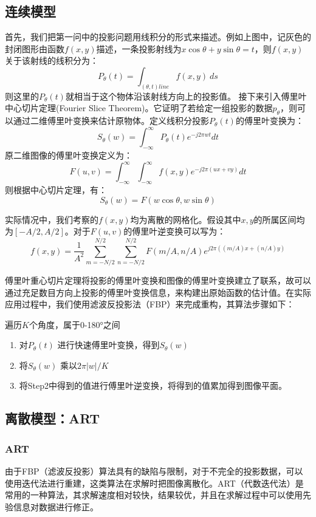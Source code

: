 \documentclass{myart}
\begin{document}
\subsection{连续模型}
首先，我们把第一问中的投影问题用线积分的形式来描述。例如上图中，记灰色的封闭图形由函数\(f(x, y)\)描述，一条投影射线为\(x\cos\theta + y\sin\theta = t\)，则\(f(x, y)\)关于该射线的线积分为：
\[ P_\theta (t) = \int_{(\theta, t) line}f(x, y)\ ds \]
则这里的\(P_\theta(t)\)就相当于这个物体沿该射线方向上的投影值。
接下来引入傅里叶中心切片定理(Fourier Slice Theorem)。\cite{toumo}它证明了若给定一组投影的数据\(p_\theta\)，则可以通过二维傅里叶变换来估计原物体。定义线积分投影\(P_\theta(t)\)的傅里叶变换为：
\[S_\theta (w) = \int_{-\infty}^{\infty}P_\theta (t) e^{-j2\pi wt}dt \]
原二维图像的傅里叶变换定义为：
\[F(u, v) = \int_{-\infty}^{\infty}\int_{-\infty}^{\infty} f(x, y)e^{-j2\pi (ux + vy)}dt\]
则根据中心切片定理，有：
\[S_\theta (w) = F(w\cos\theta, w\sin\theta) \]

实际情况中，我们考察的\( f(x, y)\)均为离散的网格化。假设其中\(x, y\)的所属区间均为\( [-A/2, A/2]\)。对于\(F(u, v)\)的傅里叶逆变换可以写为\cite{radon}：
\[f(x, y) = \frac{1}{A^2} \sum_{m = -N/2}^{N/2}\sum_{n=-N/2}^{N/2}F(m/A, n/A)e^{j2\pi ((m/A)x + (n/A)y)} \]

傅里叶重心切片定理将投影的傅里叶变换和图像的傅里叶变换建立了联系，故可以通过充足数目方向上投影的傅里叶变换信息，来构建出原始函数的估计值。在实际应用过程中，我们使用滤波反投影法（FBP）来完成重构，其算法步骤如下：

遍历\(K\)个角度，属于0-180°之间
\begin{enumerate}
  \item 对\(P_\theta (t) \) 进行快速傅里叶变换，得到\(S_\theta(w) \)
  \item 将\(S_\theta(w) \) 乘以\(2\pi|w|/K\)
  \item 将Step2中得到的值进行傅里叶逆变换，将得到的值累加得到图像平面。
\end{enumerate}


\subsection{离散模型：ART}
\subsubsection{ART}
由于FBP（滤波反投影）算法具有的缺陷与限制，对于不完全的投影数据，可以使用迭代法进行重建，这类算法在求解时把图像离散化。ART（代数迭代法）是常用的一种算法，其求解速度相对较快，结果较优，并且在求解过程中可以使用先验信息对数据进行修正。
\end{document}
